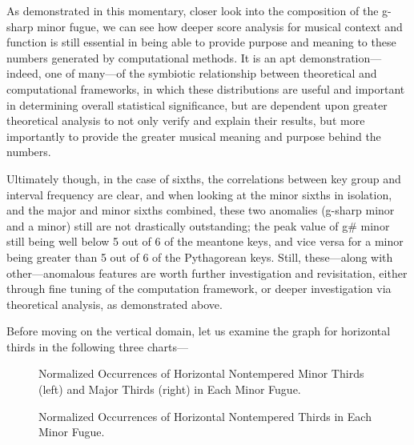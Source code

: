     \begin{center}
    \end{center}
    
    As demonstrated in this momentary, closer look into the composition of
the g-sharp minor fugue, we can see how deeper score analysis for
musical context and function is still essential in being able to provide
purpose and meaning to these numbers generated by computational methods.
It is an apt demonstration---indeed, one of many---of the
symbiotic relationship between theoretical and computational frameworks,
in which these distributions are useful and important in determining
overall statistical significance, but are dependent upon greater
theoretical analysis to not only verify and explain their results, but
more importantly to provide the greater musical meaning and purpose
behind the numbers.

Ultimately though, in the case of sixths, the correlations between key
group and interval frequency are clear, and when looking at the minor
sixths in isolation, and the major and minor sixths combined, these two
anomalies (g-sharp minor and a minor) still are not drastically
outstanding; the peak value of g\# minor still being well below 5 out of
6 of the meantone keys, and vice versa for a minor being greater than 5
out of 6 of the Pythagorean keys. Still, these---along with
other---anomalous features are worth further investigation and
revisitation, either through fine tuning of the computation framework,
or deeper investigation via theoretical analysis, as demonstrated above.

Before moving on the vertical domain, let us examine the graph for
horizontal thirds in the following three charts---



\begin{figure}[H]
    \begin{center}
    \caption[Normalized Occurrences of Horizontal Nontempered Minor and Thirds in Each Minor Fugue. ]{Normalized Occurrences of Horizontal Nontempered Minor Thirds (left) and Major Thirds (right) in Each Minor Fugue.}
    \end{center}
\end{figure}
    



\begin{figure}[H]
    \begin{center}
    \caption{Normalized Occurrences of Horizontal Nontempered Thirds in Each Minor Fugue. }
    \end{center}
\end{figure}
    
